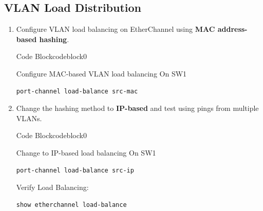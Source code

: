 \documentclass[a4paper]{article}
\begin{document}
\subsection{VLAN Load Distribution}
\begin{enumerate}
	\item Configure VLAN load balancing on EtherChannel using \textbf{MAC address-based hashing}.


	      \begin{ocg}{Code Block}{codeblock}{0}

		      \vspace{0.5cm}
		      Configure MAC-based VLAN load balancing On SW1
		      \begin{lstlisting}
port-channel load-balance src-mac
\end{lstlisting}

		      \vspace{0.5cm}
	      \end{ocg}


	\item Change the hashing method to \textbf{IP-based} and test using pings from multiple VLANs.


	      \begin{ocg}{Code Block}{codeblock}{0}

		      \vspace{0.5cm}
		      Change to IP-based load balancing On SW1
		      \begin{lstlisting}
port-channel load-balance src-ip
\end{lstlisting}

		      Verify Load Balancing:

		      \begin{lstlisting}
show etherchannel load-balance
\end{lstlisting}


		      \vspace{0.5cm}
	      \end{ocg}

\end{enumerate}
\end{document}
